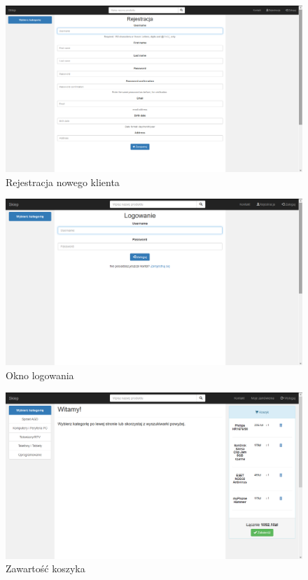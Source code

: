 \documentclass[10pt,a4paper]{article}
\begin{document}
\begin{landscape}
   		\newpage
   		\begin{figure}[H]
   		\caption{Rejestracja nowego klienta}
   		\centering
   		\includegraphics[scale=0.6]{register}
   		\end{figure}
   		
   		\newpage
   		\begin{figure}[H]
   		\caption{Okno logowania}
   		\centering
   		\includegraphics[scale=0.6]{login}
   		\end{figure}
   
   		\newpage
   		\begin{figure}[H]
   		\caption{Zawartość koszyka}
   		\centering
   		\includegraphics[scale=0.6]{koszyk}
   		\end{figure}
     	

\end{landscape}
\end{document}
